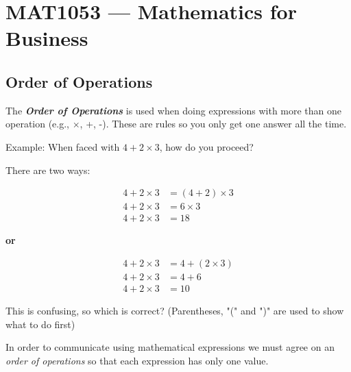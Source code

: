 \chapter{MAT1053 --- Mathematics for Business}
\label{chap:unit-fb08}

\ChapterWarning

\section{Order of Operations}
\label{sec:orde-e091}


The \textbf{\textit{Order of Operations}} is used when doing expressions with more than
one operation (e.g., $\times$, +, -). These are rules so you only get one answer all the time.



Example: When faced with $4+2 \times 3$, how do you proceed?



There are two ways:



\begin{align}
4 + 2 \times 3 &= (4 + 2) \times 3 \\ 
4 + 2 \times 3 &= 6 \times 3 \\ 
4 + 2 \times 3 &= 18
\end{align}





\textbf{or}



\begin{align}
4 + 2 \times 3 &= 4 + (2 \times 3) \\ 
4 + 2 \times 3 &= 4 + 6 \\ 
4 + 2 \times 3 &= 10
\end{align}



This is confusing, so which is correct? (Parentheses, "(" and ")" are used to show what to do first)



In order to communicate using mathematical expressions we must agree on an \textit{order
of operations} so that each expression has only one value.



